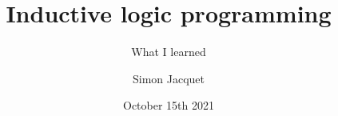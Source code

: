 \documentclass{beamer}
\title[Inductive logic programming]{Inductive logic programming}
\subtitle{What I learned}
\author{Simon Jacquet}
\institute[Unamur]{Faculty of Computer Science\\Unamur}
\date{October 15th 2021}
\begin{document}
\frame{\titlepage}

%



%
%
\end{document}
